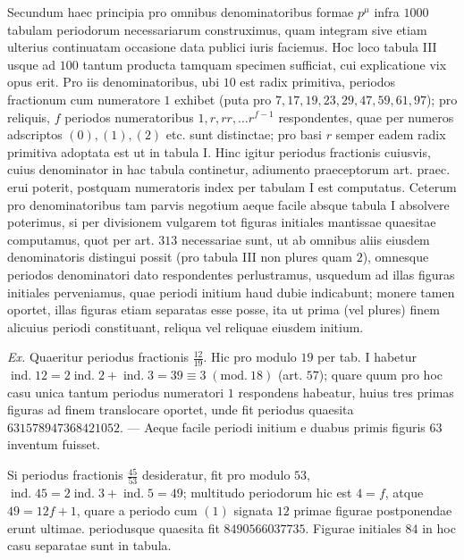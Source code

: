 Secundum haec principia pro omnibus denominatoribus formae \(p^\mu\) infra \(1000\) tabulam periodorum necessariarum construximus, quam integram sive etiam ulterius continuatam occasione data publici iuris faciemus. Hoc loco tabula III usque ad \(100\) tantum producta tamquam specimen sufficiat, cui explicatione vix opus erit. Pro iis denominatoribus, ubi \(10\) est radix primitiva, periodos fractionum cum numeratore \(1\) exhibet (puta pro \(7,17,19,23,29,47,59,61,97\)); pro reliquis, \(f\) periodos numeratoribus \(1,r,rr,\ldots r^{f-1}\) respondentes, quae per numeros adscriptos \((0),(1),(2)\) etc. sunt distinctae; pro basi \(r\) semper eadem radix primitiva adoptata est ut in tabula I. Hinc igitur periodus fractionis cuiusvis, cuius denominator in hac tabula continetur, adiumento praeceptorum art. praec. erui poterit, postquam numeratoris index per tabulam I est computatus. Ceterum pro denominatoribus tam parvis negotium aeque facile absque tabula I absolvere poterimus, si per divisionem vulgarem tot figuras initiales mantissae quaesitae computamus, quot per art. \(313\) necessariae sunt, ut ab omnibus aliis eiusdem denominatoris distingui possit (pro tabula III non plures quam \(2\)), omnesque periodos denominatori dato respondentes perlustramus, usquedum ad illas figuras initiales perveniamus, quae periodi initium haud dubie indicabunt; monere tamen oportet, illas figuras etiam separatas esse posse, ita ut prima (vel plures) finem alicuius periodi constituant, reliqua vel reliquae eiusdem initium.

\textit{Ex.} Quaeritur periodus fractionis \(\frac{12}{19}\). Hic pro modulo \(19\) per tab. I
habetur \(\operatorname{ind.}12=2\operatorname{ind.}2+\operatorname{ind.}3=39\equiv3\; (\mathrm{mod}.\ 18)\) (art. \(57\)); quare quum pro hoc casu unica tantum periodus numeratori \(1\) respondens habeatur, huius tres primas figuras ad finem translocare oportet, unde fit periodus quaesita \(631578947368421052\). — Aeque facile periodi initium e duabus primis figuris \(63\) inventum fuisset.

Si periodus fractionis \(\frac{45}{53}\) desideratur, fit pro modulo \(53\), \(\operatorname{ind.}45=2\operatorname{ind.}3 +\operatorname{ind.}5=49\); multitudo periodorum hic est \(4=f\), atque \(49=12f+1\), quare a periodo cum \((1)\) signata \(12\) primae figurae postponendae erunt ultimae. periodusque quaesita fit \(8490566037735\). Figurae initiales \(84\) in hoc casu separatae sunt in tabula.

